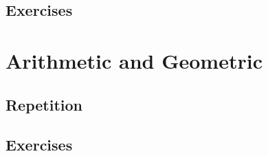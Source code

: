 \subsection{Exercises}

\newpage
\section{Arithmetic and Geometric}
\noindent{}
\subsection{Repetition}
\subsection{Exercises}


\newpage
